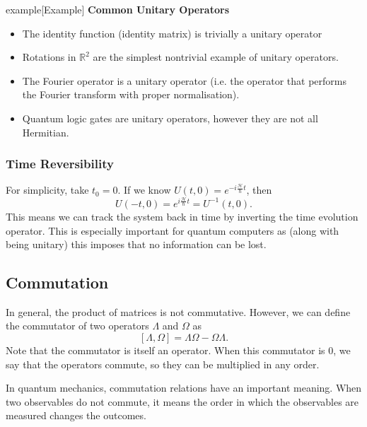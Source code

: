 \documentclass{article}
\begin{document}
\begin{callout}{example}[Example]
\label{example:s3-e4}
\textbf{Common Unitary Operators}

\begin{itemize}
    \item The identity function (identity matrix) is trivially a unitary operator
    \item Rotations in $\mathbb{R}^2$ are the simplest nontrivial example of unitary operators. 
    \item The Fourier operator is a unitary operator (i.e. the operator that performs the Fourier transform with proper normalisation).
    \item Quantum logic gates are unitary operators, however they are not all Hermitian.
\end{itemize}
\end{callout}

\subsubsection{Time Reversibility}
For simplicity, take $t_0=0$. If we know $U(t,0)=e^{-i \frac{\mathcal{H}}{\hbar}t}$, then
\[
    U(-t,0)=e^{i \frac{\mathcal{H}}{\hbar}t}=U^{-1}(t,0).
\]
This means we can track the system back in time by inverting the time evolution operator. This is especially important for quantum computers as (along with being unitary) this imposes that no information can be lost.

\subsection{Commutation}
In general, the product of matrices is not commutative. However, we can define the commutator of two operators $\Lambda$ and $\Omega $ as
\[
    \left[ \Lambda ,\Omega  \right]=\Lambda \Omega -\Omega \Lambda .
\]
Note that the commutator is itself an operator. When this commutator is $0$, we say that the operators commute, so they can be multiplied in any order.

In quantum mechanics, commutation relations have an important meaning. When two observables do not commute, it means the order in which the observables are measured changes the outcomes.
\end{document}
